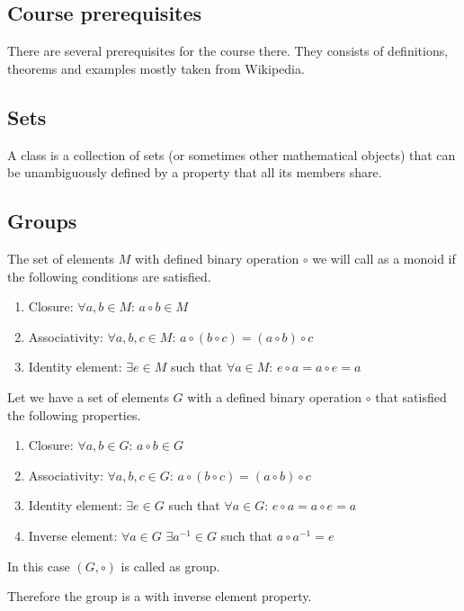 \begin{appendices}
  
\chapter{Course prerequisites}
There are several prerequisites for the course there. They consists of
definitions, theorems and examples mostly taken from Wikipedia. 

\section{Sets}

\begin{definition}[Class]
  A class is a collection of sets (or sometimes other mathematical
  objects) that can be unambiguously defined by a property that all
  its members share. 
  \label{def:class}
\end{definition}

\section{Groups}

\begin{definition}[Monoid]
  The set of elements $M$ with defined binary operation $\circ$ we will call
  as a monoid if the following conditions are satisfied.
  \begin{enumerate}
  \item Closure: $\forall a, b \in M$: $a \circ b \in M$
  \item Associativity: $\forall a, b, c \in M$:
    $a \circ \left( b \circ c \right) =
    \left( a \circ b \right) \circ c$
  \item Identity element: $\exists e \in M$ such that
    $\forall a \in M$: $e \circ a = a \circ e = a$
  \end{enumerate}
  \label{def:monoid}
\end{definition}

\begin{definition}[Group]
  Let we have a set of elements $G$ with a defined binary operation
  $\circ$ that satisfied the following properties.
  \begin{enumerate}
  \item Closure: $\forall a, b \in G$: $a \circ b \in G$
  \item Associativity: $\forall a, b, c \in G$:
    $a \circ \left( b \circ c \right) =
    \left( a \circ b \right) \circ c$
  \item Identity element: $\exists e \in G$ such that
    $\forall a \in G$: $e \circ a = a \circ e = a$
  \item Inverse element: $\forall a \in G$ $\exists a^{-1} \in G$ such that
    $a \circ a^{-1} = e$
  \end{enumerate}
  In this case $\left(G, \circ\right)$ is called as group.
  \label{def:group}
\end{definition}
Therefore the group is a  with inverse element
property. 


\end{appendices}
